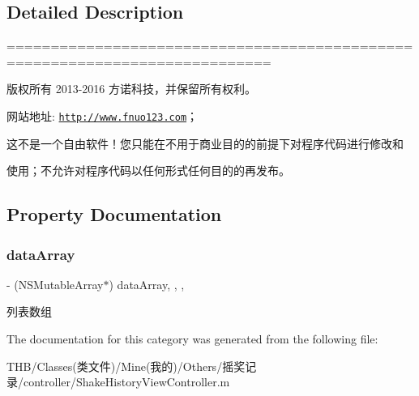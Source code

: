 \subsection{Detailed Description}
============================================================================

版权所有 2013-\/2016 方诺科技，并保留所有权利。

网站地址\+: \href{http://www.fnuo123.com}{\tt http\+://www.\+fnuo123.\+com}； 



这不是一个自由软件！您只能在不用于商业目的的前提下对程序代码进行修改和

使用；不允许对程序代码以任何形式任何目的的再发布。 

 

\subsection{Property Documentation}
\mbox{\label{category_shake_history_view_controller_07_08_a7853cf85df03d000e7decd0543a89119}} 
\subsubsection{\texorpdfstring{data\+Array}{dataArray}}
{\footnotesize\ttfamily -\/ (N\+S\+Mutable\+Array$\ast$) data\+Array\hspace{0.3cm}{\ttfamily [read]}, {\ttfamily [write]}, {\ttfamily [nonatomic]}, {\ttfamily [strong]}}

列表数组 

The documentation for this category was generated from the following file\+:\begin{DoxyCompactItemize}
\item 
T\+H\+B/\+Classes(类文件)/\+Mine(我的)/\+Others/摇奖记录/controller/Shake\+History\+View\+Controller.\+m\end{DoxyCompactItemize}
